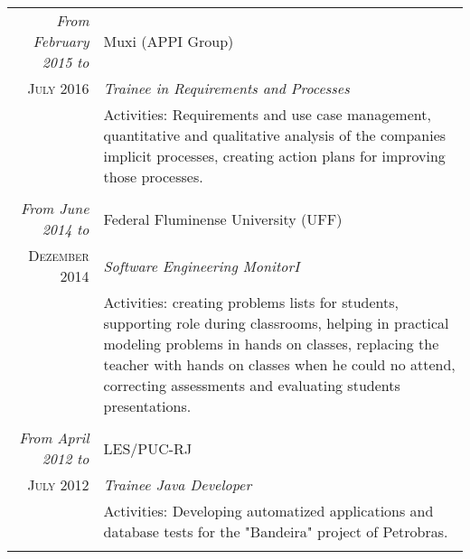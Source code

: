 \documentclass[a4paper,10pt]{article}
\begin{document}
\begin{tabular}{r|p{11cm}}
 \emph{From February 2015 to} & Muxi (APPI Group) \\
 \textsc{July 2016}&\emph{Trainee in Requirements and Processes}\\
 &\footnotesize{Activities: Requirements and use case management, quantitative and qualitative analysis of the companies implicit processes, creating action plans for improving those processes.}\\
 
 & \\
 
 \emph{From June 2014 to} & Federal Fluminense University (UFF) \\
 \textsc{Dezember 2014}&\emph{Software Engineering MonitorI}\\
 &\footnotesize{Activities: creating problems lists for students, supporting role during classrooms, helping in practical modeling problems in hands on classes, replacing the teacher with hands on classes when he could no attend, correcting assessments and evaluating students presentations.}\\
 
  & \\
 
 \emph{From April 2012 to} & LES/PUC-RJ \\
 \textsc{July 2012}&\emph{Trainee Java Developer}\\
 &\footnotesize{Activities: Developing automatized applications and database tests for the "Bandeira" project of Petrobras.}\\
 
 \multicolumn{2}{c}{} \end{tabular}
 
\end{document}
